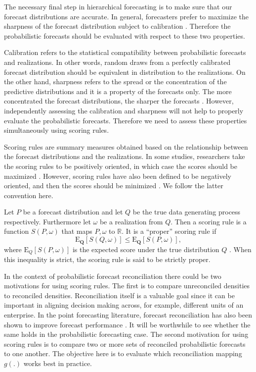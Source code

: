 \documentclass[12pt]{article}
\def\E{\text{E}}
\theoremstyle{definition}
\begin{document}
The necessary final step in hierarchical forecasting is to make sure that our forecast distributions are accurate. In general, forecasters prefer to maximize the sharpness of the forecast distribution subject to calibration \citep{Gneiting2014}. Therefore the probabilistic forecasts should be evaluated with respect to these two properties.

Calibration refers to the statistical compatibility between probabilistic forecasts and realizations. In other words, random draws from a perfectly calibrated forecast distribution should be equivalent in distribution to the realizations. On the other hand, sharpness refers to the spread or the concentration of the predictive distributions and it is a property of the forecasts only. The more concentrated the forecast distributions, the sharper the forecasts \citep{Gneiting2008}. However, independently assessing the calibration and sharpness will not help to properly evaluate the probabilistic forecasts. Therefore we need to assess these properties simultaneously using scoring rules.

Scoring rules are summary measures obtained based on the relationship between the forecast distributions and the realizations. In some studies, researchers take the scoring rules to be positively oriented, in which case the scores should be maximized \citep{Gneiting2007}. However, scoring rules have also been defined to be negatively oriented, and then the scores should be minimized \citep{Gneiting2014}. We follow the latter convention here.

Let $P$ be a forecast distribution and let $Q$ be the true data generating process respectively. Furthermore let $\omega$ be a realization from $Q$. Then a scoring rule is a function $S(P,\omega)$ that maps $P,\omega$ to $\mathbb{R}$. It is a ``proper'' scoring rule if
\begin{equation}\label{eq:prop_score}
\E_{\bm{Q}}[S(Q,\omega)] \le \E_{\bm{Q}}[S(P,\omega)] ,
\end{equation}
where $\E_{Q}[S(P,\omega)]$ is the expected score under the true distribution $Q$ \citep{Gneiting2008, Gneiting2014}. When this inequality is strict, the scoring rule is said to be strictly proper.

In the context of probabilistic forecast reconciliation there could be two motivations for using scoring rules. The first is to compare unreconciled densities to reconciled densities. Reconciliation itself is a valuable goal since it can be important in aligning decision making across, for example, different units of an enterprise. In the point forecasting literature, forecast reconciliation has also been shown to improve forecast performance \citep{AthEtAl2017, WicEtAl2019}. It will be worthwhile to see whether the same holds in the probabilistic forecasting case. The second motivation for using scoring rules is to compare two or more sets of reconciled probabilistic forecasts to one another. The objective here is to evaluate which reconciliation mapping $g(.)$ works best in practice.
\end{document}
